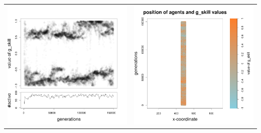 \documentclass[a4paper,10pt]{article}
\begin{document}
\begin{table}[h!]
\begin{tabular}{cc}
\newline
\includegraphics[width=\imgSize]{images/5StaticEnv/Gplot47_staticEnv0}&\includegraphics[width=\imgSize]{images/5StaticEnv/Gplot47Static_staticEnv0}\\

\end{tabular}
\end{table}
\end{document}
